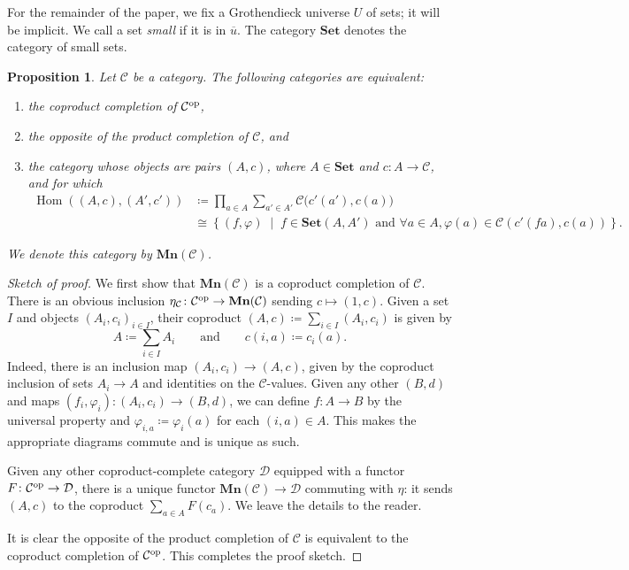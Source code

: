 \documentclass[11pt, one side, article]{memoir}
\theoremstyle{definition}
\theoremstyle{plain}
\newtheorem{proposition}[definitionx]{Proposition}
\DeclareMathOperator{\Hom}{Hom}
\newcommand{\cat}[1]{\mathcal{#1}}%
\newcommand{\Cat}[1]{\mathbf{#1}}%
\newcommand{\op}{^\tn{op}}
\newcommand{\tn}[1]{\textnormal{#1}}
\newcommand{\ol}[1]{\overline{#1}}
\newcommand{\smset}{\Cat{Set}}
\newcommand{\0}{\Cat{0}}
\newcommand{\1}{\Cat{1}}
\newcommand{\mn}{\Cat{Mn}}
\newcommand{\qqand}{\qquad\text{and}\qquad}
\begin{document}
For the remainder of the paper, we fix a Grothendieck universe $U$ of sets; it will be implicit. We call a set \emph{small} if it is in $\ol{u}$. The category $\smset$ denotes the category of small sets.

\begin{proposition}
Let $\cat{C}$ be a category. The following categories are equivalent:
\begin{enumerate}
	\item the coproduct completion of $\cat{C}\op$,
	\item the opposite of the product completion of $\cat{C}$, and
	\item the category whose objects are pairs $(A,c)$, where $A\in\smset$ and $c\colon A\to\cat{C}$, and for which
	\begin{align*}
	\Hom((A,c),(A',c'))&\coloneqq\prod_{a\in A}\sum_{a'\in A'}\cat{C}\big(c'(a'),c(a)\big)\\&\cong\left\{(f,\varphi)\;\middle|\; f\in\smset(A,A')\text{ and }\forall a\in A, \varphi(a)\in\cat{C}(c'(fa),c(a))\right\}.
	\end{align*}
\end{enumerate}
We denote this category by $\mn(\cat{C})$.
\end{proposition}
\begin{proof}[Sketch of proof]
We first show that $\mn(\cat{C})$ is a coproduct completion of $\cat{C}$. There is an obvious inclusion $\eta_\cat{C}\colon \cat{C}\op\to\mn(\cat{C})$ sending $c\mapsto (1,c)$. Given a set $I$ and objects $(A_i,c_i)_{i\in I}$, their coproduct $(A,c)\coloneqq\sum_{i\in I}(A_i,c_i)$ is given by
\[
A\coloneqq\sum_{i\in I}A_i
\qqand
c(i,a)\coloneqq c_i(a).
\]
Indeed, there is an inclusion map $(A_i,c_i)\to (A,c)$, given by the coproduct inclusion of sets $A_i\to A$ and identities on the $\cat{C}$-values. Given any other $(B,d)$ and maps $(f_i,\varphi_i)\colon (A_i,c_i)\to(B,d)$, we can define $f\colon A\to B$ by the universal property and $\varphi_{i,a}\coloneqq\varphi_i(a)$ for each $(i,a)\in A$. This makes the appropriate diagrams commute and is unique as such.

Given any other coproduct-complete category $\cat{D}$ equipped with a functor $F\colon\cat{C}\op\to\cat{D}$, there is a unique functor $\mn(\cat{C})\to\cat{D}$ commuting with $\eta$: it sends $(A,c)$ to the coproduct $\sum_{a\in A}F(c_a)$. We leave the details to the reader.

It is clear the opposite of the product completion of $\cat{C}$ is equivalent to the coproduct completion of $\cat{C}\op$. This completes the proof sketch.
\end{proof}
\end{document}
